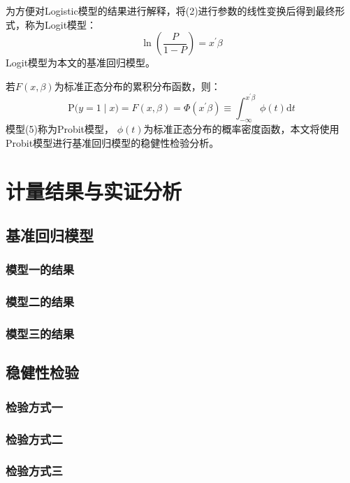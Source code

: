 \documentclass[a4paper, 12pt, oneside]{article} %
\begin{document}
	为方便对Logistic模型的结果进行解释，将(2)进行参数的线性变换后得到最终形式，称为Logit模型：
	\begin{equation}
		\ln \left( \frac{P}{1-P} \right) =x^{'}\beta
	\end{equation}
	Logit模型为本文的基准回归模型。
	
	若$F(x,\beta )$为标准正态分布的累积分布函数，则：
	\begin{equation}
		\mathrm{P(}y=1\mid x)=F(x,\beta )=\Phi \left( x^{'}\beta \right) \equiv \int_{-\infty}^{x^{'}\beta}{\phi}(t)\mathrm{d}t
	\end{equation}
	模型(5)称为Probit模型， $\phi (t)$为标准正态分布的概率密度函数，本文将使用Probit模型进行基准回归模型的稳健性检验分析。
	\section{计量结果与实证分析}
	
	\subsection{基准回归模型}
	
	\subsubsection{模型一的结果}
	
	\subsubsection{模型二的结果}
	
	\subsubsection{模型三的结果}
	
	\subsection{稳健性检验}
	
	\subsubsection{检验方式一}
	
	\subsubsection{检验方式二}
	
	\subsubsection{检验方式三}
	
\end{document}
